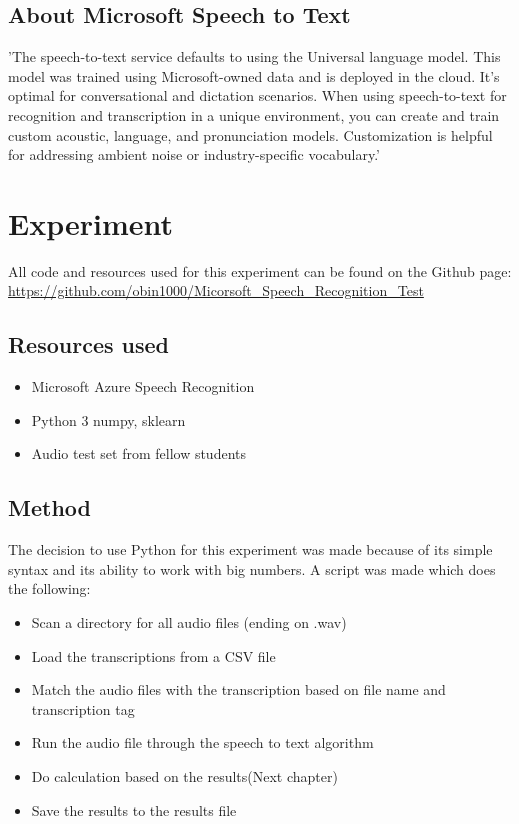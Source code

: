 \documentclass{article}
\begin{document}
\subsection{About Microsoft Speech to Text}
'The speech-to-text service defaults to using the Universal language model. This model was trained using Microsoft-owned data and is deployed in the cloud. It's optimal for conversational and dictation scenarios. When using speech-to-text for recognition and transcription in a unique environment, you can create and train custom acoustic, language, and pronunciation models. Customization is helpful for addressing ambient noise or industry-specific vocabulary.'\cite{Microsoft}

\section{Experiment}
All code and resources used for this experiment can be found on the Github page: \\
\url{https://github.com/obin1000/Micorsoft_Speech_Recognition_Test}

\subsection{Resources used}
\begin{itemize}
    \item Microsoft Azure Speech Recognition
    \item Python 3 numpy, sklearn
    \item Audio test set from fellow students
\end{itemize}


\subsection{Method}
The decision to use Python for this experiment was made because of its simple syntax and its ability to work with big numbers. A script was made which does the following:
\begin{itemize}
    \item Scan a directory for all audio files (ending on .wav)
    \item Load the transcriptions from a CSV file
    \item Match the audio files with the transcription based on file name and transcription tag
    \item Run the audio file through the speech to text algorithm
    \item Do calculation based on the results(Next chapter)
    \item Save the results to the results file
\end{itemize}
\end{document}
